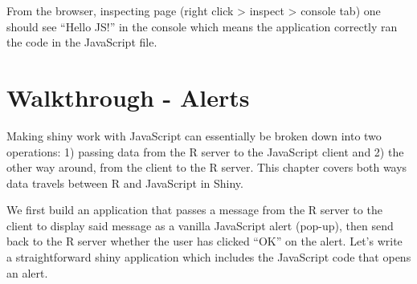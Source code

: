 \documentclass[
]{krantz}
\makeatletter
\newenvironment{Shaded}{\begin{snugshade}}{\end{snugshade}}
\newcommand{\CommentTok}[1]{\textcolor[rgb]{0.37,0.37,0.37}{\textit{#1}}}
\newcommand{\ControlFlowTok}[1]{\textcolor[rgb]{0.27,0.27,0.27}{\textbf{#1}}}
\newcommand{\DataTypeTok}[1]{\textcolor[rgb]{0.27,0.27,0.27}{#1}}
\newcommand{\KeywordTok}[1]{\textcolor[rgb]{0.27,0.27,0.27}{\textbf{#1}}}
\newcommand{\NormalTok}[1]{#1}
\newcommand{\OperatorTok}[1]{\textcolor[rgb]{0.43,0.43,0.43}{\textbf{#1}}}
\newcommand{\StringTok}[1]{\textcolor[rgb]{0.5,0.5,0.5}{#1}}
\newenvironment{kframe}{%
\medskip{}
\setlength{\fboxsep}{.8em}
 \def\at@end@of@kframe{}%
 \ifinner\ifhmode%
  \def\at@end@of@kframe{\end{minipage}}%
  \begin{minipage}{\columnwidth}%
 \fi\fi%
 \def\FrameCommand##1{\hskip\@totalleftmargin \hskip-\fboxsep
 \colorbox{shadecolor}{##1}\hskip-\fboxsep
     \hskip-\linewidth \hskip-\@totalleftmargin \hskip\columnwidth}%
 \MakeFramed {\advance\hsize-\width
   \@totalleftmargin\z@ \linewidth\hsize
   \@setminipage}}%
 {\par\unskip\endMakeFramed%
 \at@end@of@kframe}
\renewenvironment{Shaded}{\begin{kframe}}{\end{kframe}}
\makeatother
\begin{document}
\begin{Shaded}
\end{Shaded}

From the browser, inspecting page (right click \textgreater{} inspect \textgreater{} console tab) one should see ``Hello JS!'' in the console which means the application correctly ran the code in the JavaScript file.

\hypertarget{walkthrough---alerts}{%
\section{Walkthrough - Alerts}\label{walkthrough---alerts}}

Making shiny work with JavaScript can essentially be broken down into two operations: 1) passing data from the R server to the JavaScript client and 2) the other way around, from the client to the R server. This chapter covers both ways data travels between R and JavaScript in Shiny.

We first build an application that passes a message from the R server to the client to display said message as a vanilla JavaScript alert (pop-up), then send back to the R server whether the user has clicked ``OK'' on the alert. Let's write a straightforward shiny application which includes the JavaScript code that opens an alert.

\begin{Shaded}
\end{Shaded}
\end{document}
